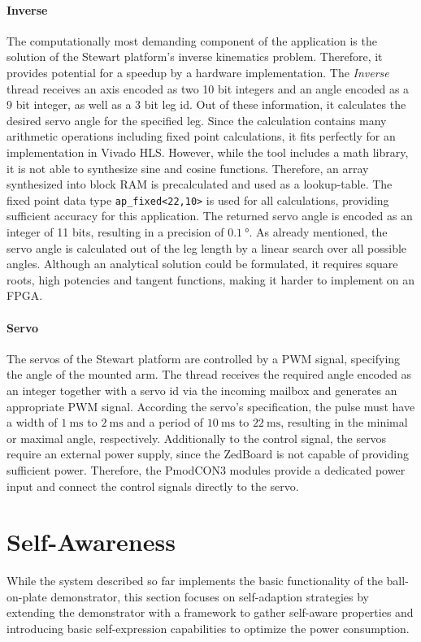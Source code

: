 \paragraph{Inverse} The computationally most demanding component of the
application is the solution of the Stewart platform's inverse kinematics
problem. Therefore, it provides  potential for a speedup by a hardware
implementation. The \emph{Inverse} thread receives an axis encoded as two 10
bit integers and an angle encoded as a 9 bit integer, as well as a 3 bit leg
id. Out of these information, it calculates the desired servo angle for the
specified leg. Since the calculation contains many arithmetic operations
including fixed point calculations, it fits perfectly for an implementation in
Vivado HLS. However, while the tool includes a math library, it is not able to
synthesize sine and cosine functions. Therefore, an array synthesized into
block \ac{RAM} is precalculated and used as a lookup-table. The fixed point
data type \lstinline{ap_fixed<22,10>} is used for all calculations, providing
sufficient accuracy for this application. The returned servo angle is encoded
as an integer of 11 bits, resulting in a precision of $\SI{0.1}{\degree}$. As
already mentioned, the servo angle is calculated out of the leg length by a
linear search over all possible angles. Although an analytical solution could
be formulated, it requires square roots, high potencies and tangent functions,
making it harder to implement on an FPGA.

\paragraph{Servo} The servos of the Stewart platform are controlled by a
\ac{PWM} signal, specifying the angle of the mounted arm. The thread receives
the required angle encoded as an integer together with a servo id via the
incoming mailbox and generates an appropriate \ac{PWM} signal. According the
servo's specification, the pulse must have a width of $\SI{1}{\milli\second}$
to $\SI{2}{\milli\second}$ and a period of $\SI{10}{\milli\second}$ to
$\SI{22}{\milli\second}$, resulting in the minimal or maximal angle,
respectively. Additionally to the control signal, the servos require an
external power supply, since the ZedBoard is not capable of providing
sufficient power. Therefore, the PmodCON3 modules provide a dedicated power
input and connect the control signals directly to the servo.

\section{Self-Awareness}
While the system described so far implements the basic functionality of the
ball-on-plate demonstrator, this section focuses on self-adaption strategies
by extending the demonstrator with a framework to gather self-aware properties
and introducing basic self-expression capabilities to optimize the power
consumption.

